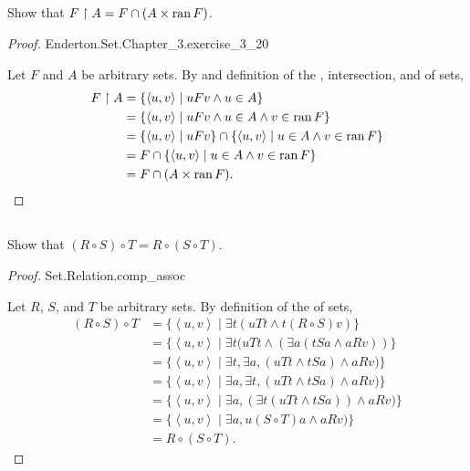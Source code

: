 \documentclass{report}
\newcommand{\pair}[1]{\left< #1 \right>}
\begin{document}
\subsection{}%

Show that $F \restriction A = F \cap (A \times \mathop{\text{ran}}{F})$.

\begin{proof}

    {Enderton.Set.Chapter\_3.exercise\_3\_20}

  Let $F$ and $A$ be arbitrary sets.
  By  and definition of the ,
    intersection, and  of sets,
    \begin{align*}
      F \restriction A
        & = \{\pair{u, v} \mid uFv \land u \in A\} \\
        & = \{\pair{u, v} \mid
          uFv \land u \in A \land v \in \ran{F}\} \\
        & = \{\pair{u, v} \mid uFv\} \cap
          \{\pair{u, v} \mid u \in A \land v \in \ran{F}\} \\
        & = F \cap \{\pair{u, v} \mid u \in A \land v \in \ran{F}\} \\
        & = F \cap (A \times \ran{F}).
    \end{align*}

\end{proof}

\subsection{}%

Show that $(R \circ S) \circ T = R \circ (S \circ T)$.

\begin{proof}

    {Set.Relation.comp\_assoc}

  Let $R$, $S$, and $T$ be arbitrary sets.
  By definition of the  of sets,
    \begin{align*}
      (R \circ S) \circ T
        & = \{\pair{u, v} \mid
          \exists t(uTt \land t(R \circ S)v)\} \\
        & = \{\pair{u, v} \mid
          \exists t(uTt \land (\exists a(tSa \land aRv))\} \\
        & = \{\pair{u, v} \mid
          \exists t, \exists a, (uTt \land tSa) \land aRv)\} \\
        & = \{\pair{u, v} \mid
          \exists a, \exists t, (uTt \land tSa) \land aRv)\} \\
        & = \{\pair{u, v} \mid
          \exists a, (\exists t(uTt \land tSa)) \land aRv)\} \\
        & = \{\pair{u, v} \mid
          \exists a, u(S \circ T)a \land aRv)\} \\
        & = R \circ (S \circ T).
    \end{align*}

\end{proof}
\end{document}
